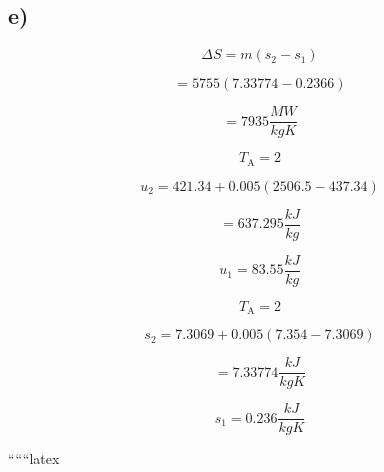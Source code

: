 

\subsection*{e)}

\begin{equation}
\Delta S = m (s_2 - s_1)
\end{equation}

\begin{equation}
= 5755 (7.33774 - 0.2366)
\end{equation}

\begin{equation}
= 7935 \frac{MW}{kgK}
\end{equation}

\begin{equation}
T_{\text{A}} = 2
\end{equation}

\begin{equation}
u_2 = 421.34 + 0.005 (2506.5 - 437.34)
\end{equation}

\begin{equation}
= 637.295 \frac{kJ}{kg}
\end{equation}

\begin{equation}
u_1 = 83.55 \frac{kJ}{kg}
\end{equation}

\begin{equation}
T_{\text{A}} = 2
\end{equation}

\begin{equation}
s_2 = 7.3069 + 0.005 (7.354 - 7.3069)
\end{equation}

\begin{equation}
= 7.33774 \frac{kJ}{kgK}
\end{equation}

\begin{equation}
s_1 = 0.236 \frac{kJ}{kgK}
\end{equation}

``````latex